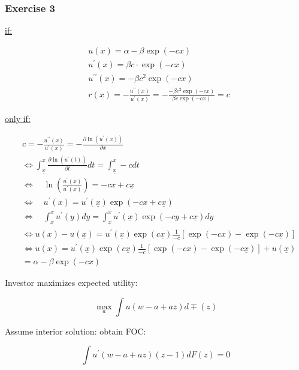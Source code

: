 {
\subsubsection*{Exercise 3}

\begin{enumerate}[label=(\alph*)]
{\item 
\underline{if:}

$$
\begin{aligned}
& u(x)=\alpha-\beta \exp (-c x) \\
& u^{\prime}(x)=\beta c \cdot \exp (-c x) \\
& u^{\prime \prime}(x)=-\beta c^{2} \exp (-c x) \\
& r(x)=-\frac{u^{\prime \prime}(x)}{u^{\prime}(x)}=-\frac{-\beta c^{2} \exp (-c x)}{\beta c \exp (-c x)}=c
\end{aligned}
$$

\underline{only if:}

$$
\begin{aligned}
& c=-\frac{u^{\prime \prime}(x)}{u^{\prime}(x)}=-\frac{\partial \ln \left(u^{\prime}(x)\right)}{\partial x} \\
& \Leftrightarrow \int_{\underline{x}}^{x} \frac{\partial \ln \left(u^{\prime}(t)\right)}{\partial t} d t=\int_{\underline{x}}^{x}-c d t \\
& \Leftrightarrow \quad \ln \left(\frac{u^{\prime}(x)}{u^{\prime}(\underline{x})}\right)=-c x+c \underline{x} \\
& \Leftrightarrow \quad u^{\prime}(x)=u^{\prime}(\underline{x}) \exp (-c x+c \underline{x}) \\
& \Leftrightarrow \quad \int_{\underline{x}}^{x} u^{\prime}(y) d y=\int_{\underline{x}}^{x} u^{\prime}(\underline{x}) \exp (-c y+c \underline{x}) d y \\
& \Leftrightarrow u(x)-u(\underline{x})=u^{\prime}(\underline{x}) \exp (c \underline{x}) \frac{1}{-c}[\exp (-c x)-\exp (-c \underline{x})] \\
& \Leftrightarrow u(x)=u^{\prime}(\underline{x}) \exp (c \underline{x}) \frac{1}{-c}[\exp (-c x)-\exp (-c \underline{x})]+u(\underline{x}) \\
&=\alpha-\beta \exp (-c x)
\end{aligned}
$$
}
{\item 
Investor maximizes expected utility:

$$
\max _{a} \int u(w-a+a z) d \mp(z)
$$

Assume interior solution: obtain FOC:

$$
\int u^{\prime}(w-a+a z)(z-1) d F(z)=0
$$

}
\end{enumerate}}

